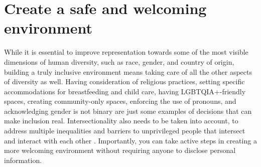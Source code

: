\documentclass[10pt,letterpaper]{article}
\begin{document}



\section{Create a safe and welcoming environment}
\label{rule_inclusion}

While it is essential to improve representation towards some of the most visible dimensions of human diversity, such as race, gender, and country of origin, building a truly inclusive environment means taking care of all the other aspects of diversity as well. Having consideration of religious practices, setting specific accommodations for breastfeeding and child care, having LGBTQIA+-friendly spaces, creating community-only spaces, enforcing the use of pronouns, and acknowledging gender is not binary  are just some examples of decisions that can make inclusion real.
Intersectionality also needs to be taken into account, to address multiple inequalities and barriers to unprivileged people that intersect and interact with each other \cite{crenshaw1989}. Importantly, you can take active steps in creating a more welcoming environment without requiring anyone to disclose personal information.
\end{document}

